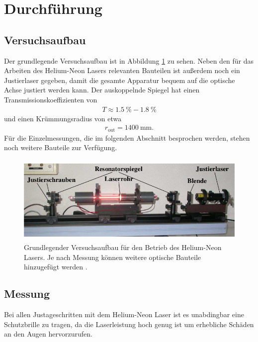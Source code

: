  \section{Durchführung}
\label{sec:Durchführung}

\subsection{Versuchsaufbau}

Der grundlegende Versuchsaufbau ist in Abbildung \ref{fig:versuchsaufbau} zu
sehen. Neben den für das Arbeiten des Helium-Neon Lasers relevanten Bauteilen
ist außerdem noch ein Justierlaser gegeben, damit die gesamte Apparatur
bequem auf die optische Achse justiert werden kann. Der auskoppelnde Spiegel
hat einen Transmissionskoeffizienten von
\begin{align}
  T \approx \SI{1.5}{\percent} - \SI{1.8}{\percent}
\end{align}
und einen Krümmungsradius von etwa
\begin{align}
  r_{\text{out}} = \SI{1400}{\milli\meter}.
\end{align}
Für die Einzelmessungen, die im folgenden Abschnitt besprochen werden,
stehen noch weitere Bauteile zur Verfügung.

\begin{figure}
  \centering
  \includegraphics[height=4.3cm]{Pics von Buddy/versuchsaufbau.png}
  \caption{Grundlegender Versuchsaufbau für den Betrieb des Helium-Neon Lasers.
  Je nach Messung können weitere optische Bauteile hinzugefügt werden \cite{anleitung}.}
  \label{fig:versuchsaufbau}
\end{figure}

\subsection{Messung}

Bei allen Justageschritten mit dem Helium-Neon Laser ist es unabdingbar eine Schutzbrille
zu tragen, da die Laserleistung hoch genug ist um erhebliche Schäden an den Augen
hervorzurufen.

